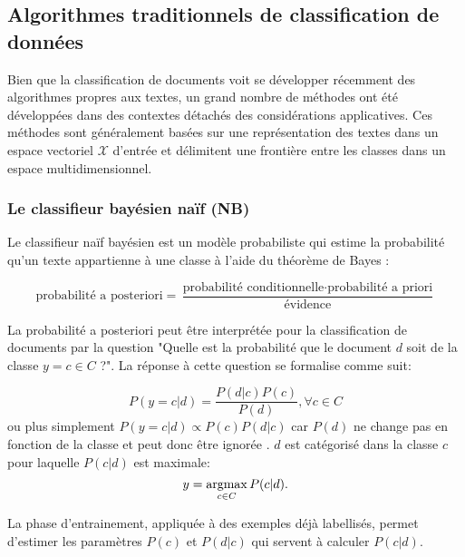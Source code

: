 \subsection{Algorithmes traditionnels de classification de données}
Bien que la classification de documents voit se développer récemment des algorithmes propres aux textes, un grand nombre de méthodes ont été développées dans des contextes détachés des considérations applicatives. Ces méthodes sont généralement basées sur une représentation des textes dans un espace vectoriel $\mathcal{X}$ d'entrée et délimitent une frontière entre les classes dans un espace multidimensionnel.

\subsubsection{Le classifieur bayésien naïf (NB)}
Le classifieur naïf bayésien \citep{duda1973patternclass} est un modèle probabiliste qui estime la probabilité qu'un texte appartienne à une classe à l'aide du théorème de Bayes \citep{raschka2014naivebayes}:

\[\text{probabilité a posteriori} = \frac{\text{probabilité conditionnelle} \cdot \text{probabilité a priori}}{\text{évidence}}\]

La probabilité a posteriori peut être interprétée pour la classification de documents par la question "Quelle est la probabilité que le document $d$ soit de la classe $y=c \in C$ ?". La réponse à cette question se formalise comme suit:

\[P(y=c \vert d) = \frac{P(d \vert c)P(c)}{P(d)}, \forall c \in C \]
ou plus simplement $P(y = c \vert d) \propto P(c)P(d \vert c)$ car $P(d)$ ne change pas en fonction de la classe et peut donc être ignorée \citep{rish2001nb_study}. $d$ est catégorisé dans la classe $c$ pour laquelle $P(c \vert d)$ est maximale: \[y = \mathop{\mathrm{argmax}}\limits_{c \in C} P(c \vert d).\]

 La phase d'entrainement, appliquée à des exemples déjà labellisés, permet d'estimer les paramètres $P(c)$ et $P(d \vert c)$ qui servent à calculer $P(c \vert d)$.

